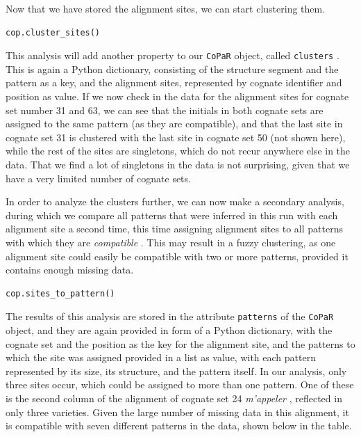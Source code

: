 \documentclass[
  a4paper,
  14pt,
  oneside,
  tablecaptionabove
]{scrbook}
\newcommand{\passthrough}[1]{#1}
\begin{document}
Now that we have stored the alignment sites, we can start clustering
them.

\begin{lstlisting}
cop.cluster_sites()
\end{lstlisting}

This analysis will add another property to our
\passthrough{\lstinline!CoPaR!} object, called
\passthrough{\lstinline!clusters!} . This is again a Python dictionary,
consisting of the structure segment and the pattern as a key, and the
alignment sites, represented by cognate identifier and position as
value. If we now check in the data for the alignment sites for cognate
set number 31 and 63, we can see that the initials in both cognate sets
are assigned to the same pattern (as they are compatible), and that the
last site in cognate set 31 is clustered with the last site in cognate
set 50 (not shown here), while the rest of the sites are singletons,
which do not recur anywhere else in the data. That we find a lot of
singletons in the data is not surprising, given that we have a very
limited number of cognate sets.

In order to analyze the clusters further, we can now make a secondary
analysis, during which we compare all patterns that were inferred in
this run with each alignment site a second time, this time assigning
alignment sites to all patterns with which they are \emph{compatible} .
This may result in a fuzzy clustering, as one alignment site could
easily be compatible with two or more patterns, provided it contains
enough missing data.

\begin{lstlisting}
cop.sites_to_pattern()
\end{lstlisting}

The results of this analysis are stored in the attribute
\passthrough{\lstinline!patterns!} of the
\passthrough{\lstinline!CoPaR!} object, and they are again provided in
form of a Python dictionary, with the cognate set and the position as
the key for the alignment site, and the patterns to which the site was
assigned provided in a list as value, with each pattern represented by
its size, its structure, and the pattern itself. In our analysis, only
three sites occur, which could be assigned to more than one pattern. One
of these is the second column of the alignment of cognate set 24
\emph{m'appeler} , reflected in only three varieties. Given the large
number of missing data in this alignment, it is compatible with seven
different patterns in the data, shown below in the table.
\end{document}
